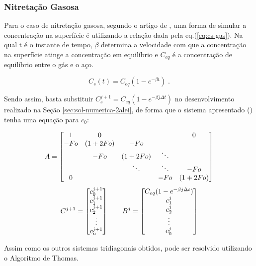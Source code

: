 \subsubsection{Nitretação Gasosa}
\label{sec:nit-gas}
Para o caso de nitretação gasosa, segundo o artigo de \cite{christiansen2008nitrogen}, uma forma de simular a concentração na superfície é utilizando a relação dada pela eq.(\ref{eq:cs-gas}). Na qual t é o instante de tempo, $\beta$ determina a velocidade com que a concentração na superfície atinge a concentração em equilíbrio e $C_{eq}$ é a concentração de equilíbrio entre o gás e o aço.

\begin{equation}
\label{eq:cs-gas}
C_{s}(t) = C_{eq}(1 - e^{-\beta t}) \;.
\end{equation}

Sendo assim, basta substituir $C_s^{j+1} = C_{eq}(1 - e^{-\beta j\Delta t})$ no desenvolvimento realizado na Seção \autoref{sec:sol-numerica-2alei}, de forma que o sistema apresentado () tenha uma equação para $c_0$:

\begin{equation*}
	\cmrtext{A} =
	\begin{bmatrix}
		  1 & 0 &         &        & 0\\
		-Fo & (1+2Fo) &  -Fo   &        & \\
		    & -Fo &   (1+2Fo)   & \ddots & \\
		    &     &  \ddots & \ddots & -Fo \\
	     0  &     &         &  -Fo   & (1+2Fo) 
	\end{bmatrix}
\end{equation*}
\begin{equation*}
	\cmrtext{C^{j+1}} =
	\begin{bmatrix}
		c_0^{j+1} \\
		c_1^{j+1} \\
		c_2^{j+1} \\
		\vdots \\
		c_n^{j+1}
	\end{bmatrix}
	\qquad
	\cmrtext{B^j} =	
	\begin{bmatrix}
		C_{eq}(1 - e^{-\beta j\Delta t}) \\
		c_1^j \\
		c_2^{j} \\
		\vdots \\
		c_n^{j}
	\end{bmatrix}
\end{equation*}

Assim como os outros sistemas tridiagonais obtidos, pode ser resolvido utilizando o Algoritmo de Thomas.